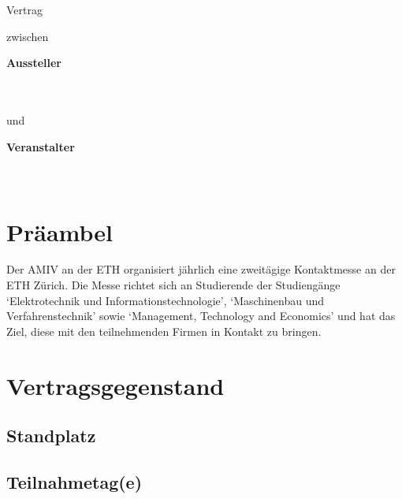 \renewcommand*{\thesection}{\S\ \arabic{section}}

\noindent
\begin{center}
\amivfairtitle
\bigbreak
\begin{huge}
Vertrag
\end{huge}
\medbreak
zwischen
\bigbreak
\end{center}

\vspace{2cm}

\begin{minipage}[t]{0.4\textwidth}
\textbf{Aussteller}
\bigbreak
\companyname\\
\companyaddress\\
\companycity\\
\companycountry
\end{minipage}%
\begin{minipage}[t]{0.2\textwidth}
und
\end{minipage}%
\begin{minipage}[t]{0.4\textwidth}
\textbf{Veranstalter}
\bigbreak
\amivname\\
\amivaddress\\
\amivpostal\ \amivcity
\end{minipage}

\vfill
\section*{Präambel}

Der AMIV an der ETH organisiert jährlich eine zweitägige Kontaktmesse an der
ETH Zürich. Die Messe richtet sich an Studierende der Studiengänge
`Elektrotechnik und Informationstechnologie',
`Maschinenbau und Verfahrenstechnik' sowie
`Management, Technology and Economics' und hat das Ziel, diese mit den
teilnehmenden Firmen in Kontakt zu bringen.

\newpage
\section{Vertragsgegenstand}
\subsection{Standplatz}

\companyboothchoice\hfill\companyboothprice
\companyboothinfo

\subsection{Teilnahmetag(e)}

